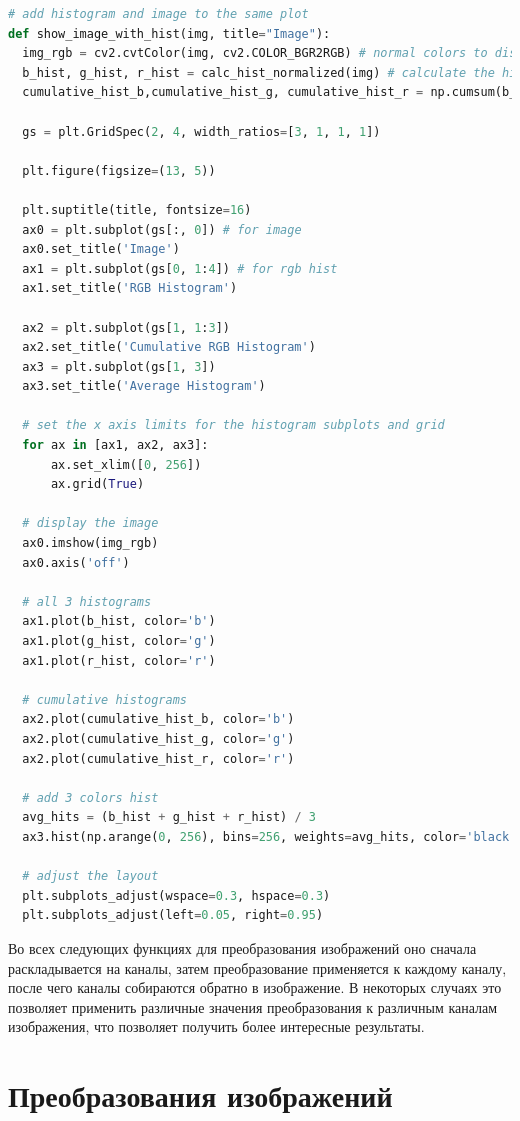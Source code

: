 \begin{lstlisting}[language=Python]
# add histogram and image to the same plot
def show_image_with_hist(img, title="Image"):
  img_rgb = cv2.cvtColor(img, cv2.COLOR_BGR2RGB) # normal colors to display
  b_hist, g_hist, r_hist = calc_hist_normalized(img) # calculate the histograms
  cumulative_hist_b,cumulative_hist_g, cumulative_hist_r = np.cumsum(b_hist), np.cumsum(g_hist), np.cumsum(r_hist) # calculate the cumulative histograms

  gs = plt.GridSpec(2, 4, width_ratios=[3, 1, 1, 1])

  plt.figure(figsize=(13, 5))

  plt.suptitle(title, fontsize=16)
  ax0 = plt.subplot(gs[:, 0]) # for image 
  ax0.set_title('Image')
  ax1 = plt.subplot(gs[0, 1:4]) # for rgb hist
  ax1.set_title('RGB Histogram')

  ax2 = plt.subplot(gs[1, 1:3])
  ax2.set_title('Cumulative RGB Histogram')
  ax3 = plt.subplot(gs[1, 3])
  ax3.set_title('Average Histogram')

  # set the x axis limits for the histogram subplots and grid
  for ax in [ax1, ax2, ax3]:
      ax.set_xlim([0, 256])
      ax.grid(True)

  # display the image
  ax0.imshow(img_rgb)
  ax0.axis('off')

  # all 3 histograms
  ax1.plot(b_hist, color='b')
  ax1.plot(g_hist, color='g')
  ax1.plot(r_hist, color='r')

  # cumulative histograms
  ax2.plot(cumulative_hist_b, color='b')
  ax2.plot(cumulative_hist_g, color='g')
  ax2.plot(cumulative_hist_r, color='r')

  # add 3 colors hist
  avg_hits = (b_hist + g_hist + r_hist) / 3
  ax3.hist(np.arange(0, 256), bins=256, weights=avg_hits, color='black')

  # adjust the layout
  plt.subplots_adjust(wspace=0.3, hspace=0.3)
  plt.subplots_adjust(left=0.05, right=0.95)  
\end{lstlisting}

Во всех следующих функциях для преобразования изображений оно сначала раскладывается на каналы, затем преобразование применяется к каждому каналу, после чего каналы собираются обратно в изображение. 
В некоторых случаях это позволяет применить различные значения преобразования к различным каналам изображения, что позволяет получить более интересные результаты.

\section{Преобразования изображений}

